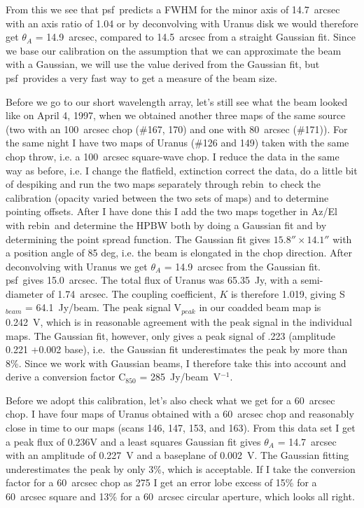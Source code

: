 \documentclass[twoside,11pt]{article}
\newcommand{\task}[1]{\textsf{#1}}
\newcommand{\rebin}{\xref{\task{rebin}}{sun216}{REBIN}}
\newcommand{\psf}{\xref{\task{psf}}{sun95}{PSF}}
\newcommand{\xref}[3]{#1}
\begin{document}
{From this we see that \psf\ predicts a FWHM for the minor axis of 14.7~arcsec
with an axis ratio of 1.04 or by deconvolving with Uranus disk we would
therefore get $\theta_A$ = 14.9~arcsec, compared to 14.5~arcsec from a straight
Gaussian fit. Since we base our calibration on the assumption that we
can approximate the beam with a Gaussian, we will use the value derived
from the Gaussian fit, but \psf\ provides a very fast way to get a
measure of the beam size.

Before we go to our short wavelength array, let's still see what the
beam looked like on April 4, 1997, when we obtained another three maps
of the same source (two with an 100~arcsec chop (\#167, 170) and one with 80~arcsec
(\#171)). For the same night I have two maps of Uranus  (\#126 and 149)
taken with the same chop throw, i.e. a 100~arcsec square-wave chop. I reduce
the data in the same way as before, i.e. I change the flatfield,
extinction correct the data, do a little bit of despiking and run
the two maps separately through \rebin\ to check the calibration
(opacity varied between the two sets of maps) and to determine pointing
offsets. After I have done this I add the two maps together in Az/El
with \rebin\ and determine the HPBW both by doing a Gaussian fit and
by determining the point spread function. The Gaussian fit gives $15.8''
\times 14.1''$ with a position angle of 85 deg, i.e. the beam is elongated in the
chop direction. After deconvolving with Uranus we get $\theta_A$ = 14.9~arcsec
from the Gaussian fit. \psf\ gives 15.0~arcsec. The total flux of Uranus was
65.35~Jy, with a semi-diameter of 1.74~arcsec.  The coupling coefficient, $K$
is therefore 1.019, giving S$_{beam}$ = 64.1~Jy/beam. The peak signal
V$_{peak}$ in our coadded beam map is 0.242~V, which is in reasonable
agreement with the peak signal in the individual maps. The Gaussian fit,
however, only gives a peak signal of .223 (amplitude 0.221 +0.002 base), i.e.\
the Gaussian fit underestimates the peak by more than 8\%. Since we work with
Gaussian beams, I therefore take this into account and derive a conversion
factor C$_{850}$ = 285~Jy/beam~V$^{-1}$.

Before we adopt this calibration, let's also check what we get for a 60~arcsec
chop. I have four maps of Uranus obtained with a 60~arcsec chop and reasonably
close in time to our maps (scans 146, 147, 153, and 163). From this
data set I get a peak flux of 0.236V and a least squares Gaussian fit
gives $\theta_A$ = 14.7~arcsec with an amplitude of 0.227~V and a baseplane of
0.002~V. The Gaussian fitting underestimates the peak by only
3\%, which is acceptable. If I take the conversion factor for a 60~arcsec
chop as 275 I get an error lobe excess of 15\% for a 60~arcsec square and 13\%
for a 60~arcsec circular aperture, which looks all right.

}
\end{document}
